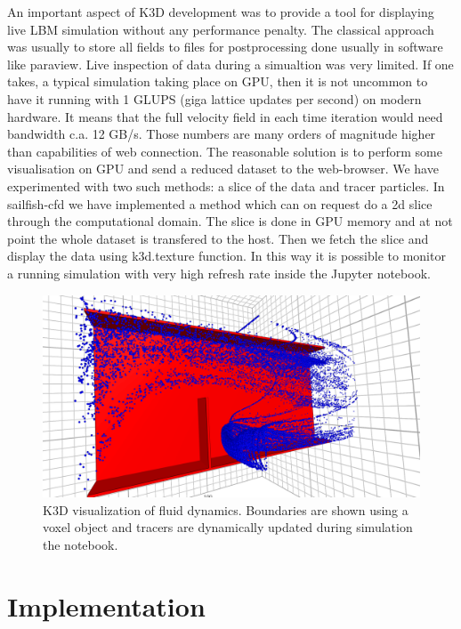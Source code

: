 \documentclass{deliverablereport}
\begin{document}
An important aspect of K3D development was to provide a tool for
displaying live LBM simulation without any performance penalty. The
classical approach was usually to store all fields to files for
postprocessing done usually in software like paraview. Live inspection
of data during a simualtion was very limited.  If one takes, a typical
simulation taking place on GPU, then it is not uncommon to have it
running with 1 GLUPS (giga lattice updates per second) on modern
hardware. It means that the full velocity field in each time iteration
would need bandwidth c.a. 12 GB/s. Those numbers are many orders of
magnitude higher than capabilities of web connection.  The reasonable
solution is to perform some visualisation on GPU and send a reduced
dataset to the web-browser. We have experimented with two such
methods: a slice of the data and tracer particles. In sailfish-cfd we
have implemented a method which can on request do a 2d slice through
the computational domain. The slice is done in GPU memory and at not
point the whole dataset is transfered to the host. Then we fetch the
slice and display the data using k3d.texture function. In this way it
is possible to monitor a running simulation with very high refresh
rate inside the Jupyter notebook. 


\begin{figure}[ht]
  \includegraphics[width=\textwidth,trim={0 0 0 1px},clip]{k3d_cfd2.png}
  \caption{K3D visualization of fluid
  dynamics. Boundaries are shown using a voxel object and tracers are
  dynamically updated during simulation the notebook.}
\end{figure}
 



\section{Implementation}
\end{document}
